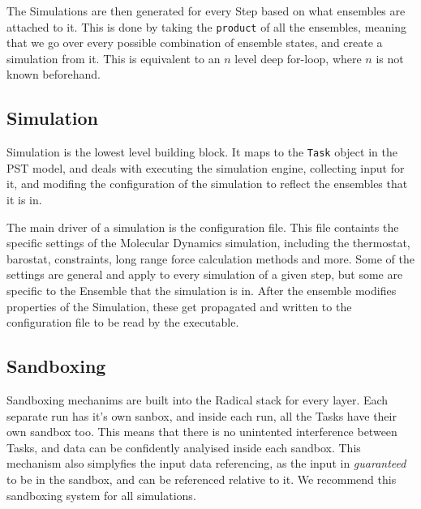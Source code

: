 The Simulations are then generated for every Step based on what ensembles are
attached to it. This is done by taking the \texttt{product} of all the
ensembles, meaning that we go over every possible combination of ensemble
states, and create a simulation from it. This is equivalent to an $n$ level
deep for-loop, where $n$ is not known beforehand.

\subsection{Simulation}

Simulation is the lowest level building block.  It maps to the \texttt{Task} object in the PST
model, and deals with executing the simulation engine, collecting input for
it, and modifing the configuration of the simulation to reflect the ensembles
that it is in.

The main driver of a simulation is the configuration file. This file
containts the specific settings of the Molecular Dynamics simulation,
including the thermostat, barostat, constraints, long range force calculation
methods and more. Some of the settings are general and apply to every
simulation of a given step, but some are specific to the Ensemble that the
simulation is in. After the ensemble modifies properties of the Simulation,
these get propagated and written to the configuration file to be read by the
executable.

\subsection{Sandboxing}

Sandboxing mechanims are built into the Radical stack for every layer. Each
separate run has it's own sanbox, and inside each run, all the Tasks have
their own sandbox too. This means that there is no unintented interference
between Tasks, and data can be confidently analyised inside each sandbox.
This mechanism also simplyfies the input data referencing, as the input in
\emph{guaranteed} to be in the sandbox, and can be referenced relative to it.
We recommend this sandboxing system for all simulations.

